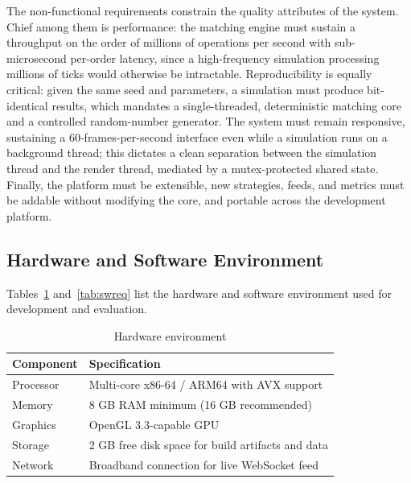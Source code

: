 \documentclass[12pt,oneside,a4paper]{report}
\begin{document}
The non-functional requirements constrain the quality attributes of the system. Chief among them is performance: the matching engine must sustain a throughput on the order of millions of operations per second with sub-microsecond per-order latency, since a high-frequency simulation processing millions of ticks would otherwise be intractable. Reproducibility is equally critical: given the same seed and parameters, a simulation must produce bit-identical results, which mandates a single-threaded, deterministic matching core and a controlled random-number generator. The system must remain responsive, sustaining a 60-frames-per-second interface even while a simulation runs on a background thread; this dictates a clean separation between the simulation thread and the render thread, mediated by a mutex-protected shared state. Finally, the platform must be extensible, new strategies, feeds, and metrics must be addable without modifying the core, and portable across the development platform.

\subsection{Hardware and Software Environment}

Tables~\ref{tab:hwreq} and~\ref{tab:swreq} list the hardware and software environment used for development and evaluation.

\begin{table}[H]
\centering
\caption{Hardware environment}
\label{tab:hwreq}
\small
\begin{tabular}{p{2in}p{3in}}
\toprule
\textbf{Component} & \textbf{Specification} \\
\midrule
Processor & Multi-core x86-64 / ARM64 with AVX support \\
Memory & 8 GB RAM minimum (16 GB recommended) \\
Graphics & OpenGL 3.3-capable GPU \\
Storage & 2 GB free disk space for build artifacts and data \\
Network & Broadband connection for live WebSocket feed \\
\bottomrule
\end{tabular}
\end{table}
\end{document}
